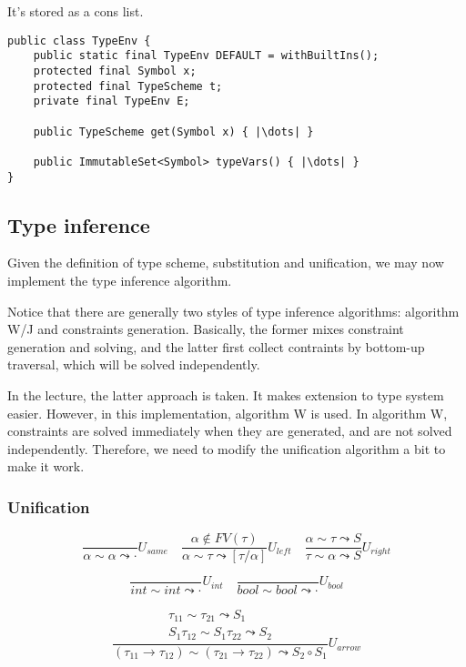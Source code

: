 \documentclass[a4paper]{article}
\begin{document}
It's stored as a cons list.

\begin{verbatim}
public class TypeEnv {
    public static final TypeEnv DEFAULT = withBuiltIns();
    protected final Symbol x;
    protected final TypeScheme t;
    private final TypeEnv E;

    public TypeScheme get(Symbol x) { |\dots| }

    public ImmutableSet<Symbol> typeVars() { |\dots| }
}
\end{verbatim}

\subsection{Type inference}

Given the definition of type scheme, substitution and unification, we may now implement the type inference algorithm.

Notice that there are generally two styles of type inference algorithms: algorithm W/J and constraints generation. Basically, the former mixes constraint generation and solving, and the latter first collect contraints by bottom-up traversal, which will be solved independently.

In the lecture, the latter approach is taken. It makes extension to type system easier. However, in this implementation, algorithm W is used. In algorithm W, constraints are solved immediately when they are generated, and are not solved independently. Therefore, we need to modify the unification algorithm a bit to make it work.

\subsubsection{Unification}

\[
    \frac{}{\alpha \sim \alpha \leadsto \boldsymbol{\cdot}}U_{same} \quad
    \frac{\alpha \notin FV(\tau)}{\alpha \sim \tau \leadsto [\tau/\alpha]}U_{left} \quad
    \frac{\alpha \sim \tau \leadsto S}{\tau \sim \alpha \leadsto S}U_{right}
\]

\[
    \frac{}{int \sim int \leadsto \boldsymbol{\cdot}}U_{int} \quad
    \frac{}{bool \sim bool \leadsto \boldsymbol{\cdot}}U_{bool}
\]

\[
    \frac{
        \begin{array}{c}
            \tau_{11} \sim \tau_{21} \leadsto S_1 \\
            S_1\tau_{12} \sim S_1\tau_{22} \leadsto S_2
        \end{array}
    }
    {(\tau_{11} \to \tau_{12}) \sim (\tau_{21} \to \tau_{22}) \leadsto S_2 \circ S_1}
    U_{arrow}
\]
\end{document}
